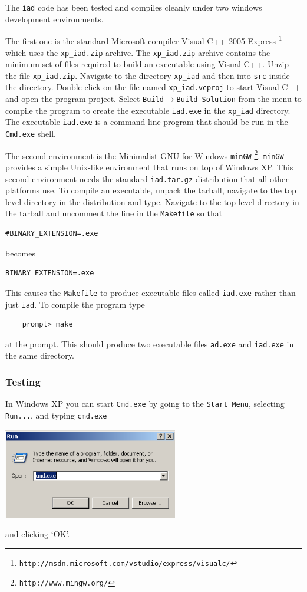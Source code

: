 \documentclass{article}
\newcommand\iadprog{\texttt{iad}}
\begin{document}
The \iadprog{} code has been tested and compiles cleanly under two windows
development environments.  

The first one is the 
standard Microsoft compiler Visual C++ 2005 Express%
\footnote{\texttt{http://msdn.microsoft.com/vstudio/express/visualc/}}
which uses the \texttt{xp\_iad.zip} archive.  The \texttt{xp\_iad.zip} archive
contains the minimum set of files required to build an executable using
Visual C++.  Unzip the file \texttt{xp\_iad.zip}. 
Navigate to the directory \texttt{xp\_iad} and then into \texttt{src} inside the directory.
Double-click on the file named \texttt{xp\_iad.vcproj} to start Visual C++ and
open the program project.  Select \texttt{Build}$\rightarrow$\texttt{Build Solution} from 
the menu to compile the program to create the executable \texttt{iad.exe} 
in the \texttt{xp\_iad} directory.
The executable \texttt{iad.exe} is a command-line program that should be
run in the \texttt{Cmd.exe} shell.   

The second environment is the Minimalist GNU for Windows \texttt{minGW}%
\footnote{\texttt{http://www.mingw.org/}}.  \texttt{minGW} provides a
simple Unix-like environment that runs on top of Windows XP.  This second environment
needs the standard \texttt{iad.tar.gz} distribution that all other platforms use.  To compile an executable,  unpack
the tarball, navigate to the top level directory in the distribution and type.  Navigate to the top-level directory in the tarball and uncomment the line in the \texttt{Makefile} so that
\begin{verbatim}
#BINARY_EXTENSION=.exe
\end{verbatim}
becomes
\begin{verbatim}
BINARY_EXTENSION=.exe
\end{verbatim}
This causes the \texttt{Makefile} to produce executable files called \texttt{iad.exe} rather than just \texttt{iad}.  To compile the program type
\begin{verbatim}
    prompt> make
\end{verbatim}
at the prompt.  This should produce two executable files \texttt{ad.exe} and \texttt{iad.exe} in the 
same directory.

\subsubsection{Testing}

In Windows XP you can start \texttt{Cmd.exe} by
going to the \texttt{Start Menu}, selecting \texttt{Run...}, and typing
\texttt{cmd.exe} 
\begin{center}
\includegraphics[width=3in]{cmdexe.png}
\end{center}
and clicking `OK'. 
\end{document}
